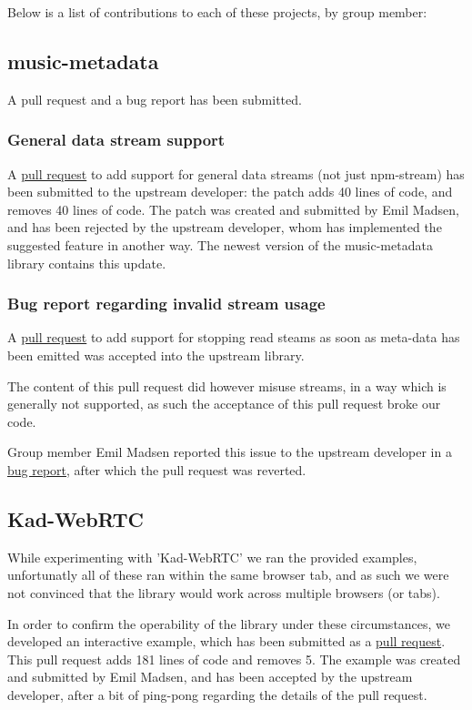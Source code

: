 Below is a list of contributions to each of these projects, by group member:
\subsection{music-metadata}
A pull request and a bug report has been submitted.

\subsubsection{General data stream support}
A \href{https://github.com/leetreveil/musicmetadata/pull/114}{pull request} to
add support for general data streams (not just npm-stream) has been submitted
to the upstream developer: the patch adds 40 lines of code, and removes 40
lines of code.
\newline\newline
The patch was created and submitted by Emil Madsen, and has been rejected by
the upstream developer, whom has implemented the suggested feature in another
way. The newest version of the music-metadata library contains this update.

\subsubsection{Bug report regarding invalid stream usage}
A \href{https://github.com/leetreveil/musicmetadata/pull/116}{pull request} to
add support for stopping read steams as soon as meta-data has been emitted was
accepted into the upstream library.

The content of this pull request did however misuse streams, in a way which is
generally not supported, as such the acceptance of this pull request broke our
code.

Group member Emil Madsen reported this issue to the upstream developer in a
\href{https://github.com/leetreveil/musicmetadata/issues/120}{bug report},
after which the pull request was reverted.

\subsection{Kad-WebRTC}
\label{subsec:appendix-kad-webrtc}
While experimenting with 'Kad-WebRTC' we ran the provided examples, 
unfortunatly all of these ran within the same browser tab, and as such we were
not convinced that the library would work across multiple browsers (or tabs).

In order to confirm the operability of the library under these circumstances,
we developed an interactive example, which has been submitted as a 
\href{https://github.com/kadtools/kad-webrtc/pull/11}{pull request}. This pull
request adds 181 lines of code and removes 5.
\newline\newline
The example was created and submitted by Emil Madsen, and has been accepted by
the upstream developer, after a bit of ping-pong regarding the details of the 
pull request.

